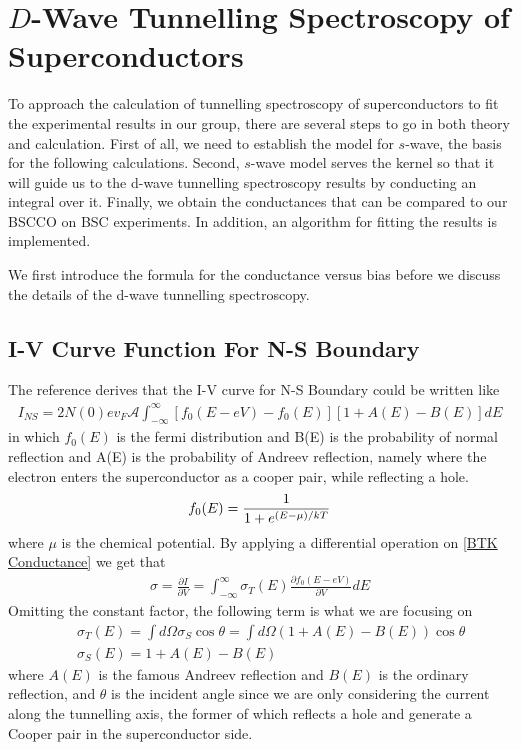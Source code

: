\section{$D$-Wave Tunnelling Spectroscopy of Superconductors}
To approach the calculation of tunnelling spectroscopy of superconductors to fit the experimental results in our group, there are several steps to go in both theory and calculation. First of all, we need to establish the model for $s$-wave, the basis for the following calculations. Second, $s$-wave model serves the kernel so that it will guide us to the d-wave tunnelling spectroscopy results by conducting an integral over it. Finally, we obtain the conductances that can be compared to our BSCCO on BSC experiments. In addition, an algorithm for fitting the results is implemented.

We first introduce the formula for the conductance versus bias\citep{Reference6} before we discuss  the details of the d-wave tunnelling spectroscopy.  
\subsection{I-V Curve Function For N-S Boundary}
The reference\citep{Reference6} derives that the I-V curve for N-S Boundary could be written like
\begin{eqnarray}\label{BTK Conductance}
I_{NS}=2N(0)ev_F\mathcal{A}\int_{-\infty}^{\infty}[f_0(E-eV)-f_0(E)][1+A(E)-B(E)]dE
\end{eqnarray}
in which $f_0(E)$ is the fermi distribution and B(E) is the probability of normal reflection and A(E) is the probability of Andreev reflection, namely where the electron enters the superconductor as a cooper pair, while reflecting a hole.
\begin{eqnarray}
f_0(E) = {\displaystyle\frac{1}{1+e^{(E-\mu)/kT}}}
\end{eqnarray}
where $\mu$ is the chemical potential. 
By applying a differential operation on \eqref{BTK Conductance} we get that
\begin{eqnarray}\label{Conductance}
\sigma=\frac{\partial I}{\partial V}=\int_{-\infty}^{\infty}\sigma_T(E)\frac{\partial{f_0(E-eV)}}{\partial{V}}dE
\end{eqnarray}
Omitting the constant factor, the following term is what we are focusing on
\begin{eqnarray}\label{2D-Kernel}
&&\sigma_T(E) = \int d\Omega\sigma_S\cos\theta=\int d\Omega(1+A(E)-B(E))\cos\theta\nonumber\\
&&\sigma_S(E)=1+A(E)-B(E)
\end{eqnarray}
where $A(E)$ is the famous Andreev reflection and $B(E)$ is the ordinary reflection, and $\theta$ is the incident angle since we are only considering the current along the tunnelling axis\citep{Reference6}, the former of which reflects a hole and generate a Cooper pair in the superconductor side.

